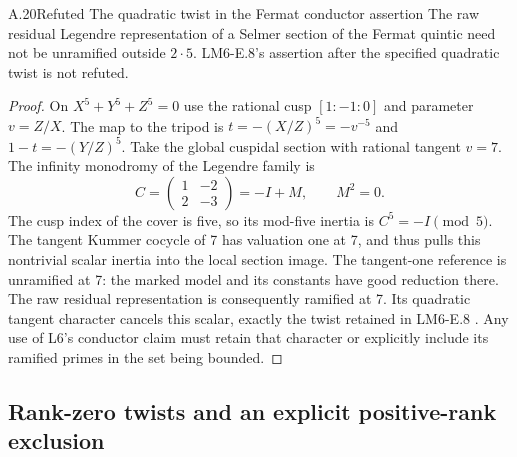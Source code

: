 \begin{statement}{A.20}{Refuted}
{The quadratic twist in the Fermat conductor assertion}
The raw residual Legendre representation of a Selmer section of the
Fermat quintic need not be unramified outside $2\cdot5$.
LM6-E.8's assertion after the specified quadratic twist is not refuted.
\end{statement}
\begin{proof}
On $X^5+Y^5+Z^5=0$ use the rational cusp $[1:-1:0]$ and parameter
$v=Z/X$.  The map to the tripod is
$t=-(X/Z)^5=-v^{-5}$ and $1-t=-(Y/Z)^5$.
Take the global cuspidal section with rational tangent $v=7$.
The infinity monodromy of the Legendre family is
\[
 C=\begin{pmatrix}1&-2\\2&-3\end{pmatrix}=-I+M,
          \qquad M^2=0.
\]
The cusp index of the cover is five, so its mod-five inertia is
$C^5=-I\pmod5$.  The tangent Kummer cocycle of 7 has valuation one
at 7, and thus pulls this nontrivial scalar inertia into the local
section image.  The tangent-one reference is unramified at 7: the
marked model and its constants have good reduction there.  The raw
residual representation is consequently ramified at 7.  Its quadratic
tangent character cancels this scalar, exactly the twist retained in
LM6-E.8 \cite{LegLM62026}.  Any use of L6's conductor claim must retain
that character or explicitly include its ramified primes in the set
being bounded.
\end{proof}

\subsection{Rank-zero twists and an explicit positive-rank exclusion}

